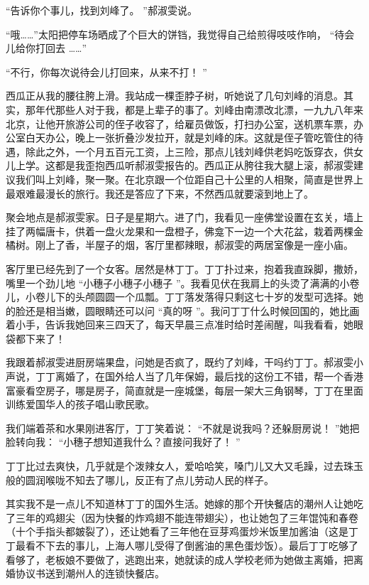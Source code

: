 \documentclass[12pt,twoside,openany]{book}
\begin{document}
“告诉你个事儿，找到刘峰了。 ”郝淑雯说。

“哦……”太阳把停车场晒成了个巨大的饼铛，我觉得自己给煎得吱吱作响， “待会儿给你打回去 ……”

“不行，你每次说待会儿打回来，从来不打！ ”

西瓜正从我的腰往胯上滑。我站成一棵歪脖子树，听她说了几句刘峰的消息。其实，那年代那些人对于我，都是上辈子的事了。刘峰由南漂改北漂，一九九八年来北京，让他开旅游公司的侄子收容了，给雇员做饭，打扫办公室，送机票车票，办公室白天办公，晚上一张折叠沙发拉开，就是刘峰的床。这就是侄子管吃管住的待遇，除此之外，一个月五百元工资，上三险，那点儿钱刘峰供老妈吃饭穿衣，供女儿上学。这都是我歪抱西瓜听郝淑雯报告的。西瓜正从胯往我大腿上滚，郝淑雯建议我们叫上刘峰，聚一聚。在北京跟一个位距自己十公里的人相聚，简直是世界上最艰难最漫长的旅行。我还是答应了下来，不然西瓜就要滚到地上了。

聚会地点是郝淑雯家。日子是星期六。进了门，我看见一座佛堂设置在玄关，墙上挂了两幅唐卡，供着一盘火龙果和一盘橙子，佛龛下一边一个大花盆，栽着两棵金橘树。刚上了香，半屋子的烟，客厅里都辣眼，郝淑雯的两居室像是一座小庙。

客厅里已经先到了一个女客。居然是林丁丁。丁丁扑过来，抱着我直跺脚，撒娇，嘴里一个劲儿地 “小穗子小穗子小穗子 ”。我看见伏在我肩上的头烫了满满的小卷儿，小卷儿下的头颅圆圆一个瓜瓢。丁丁落发落得只剩这七十岁的发型可选择。她的脸还是相当嫩，圆眼睛还可以问 “真的呀 ”。我问丁丁什么时候回国的，她比画着小手，告诉我她回来三四天了，每天早晨三点准时给时差闹醒，叫我看看，她眼袋都下来了！

我跟着郝淑雯进厨房端果盘，问她是否疯了，既约了刘峰，干吗约丁丁。郝淑雯小声说，丁丁离婚了，在国外给人当了几年保姆，最后找的这份工不错，帮一个香港富豪看空房子，哪是房子，简直就是一座城堡，每层一架大三角钢琴，丁丁在里面训练爱国华人的孩子唱山歌民歌。

我们端着茶和水果刚进客厅，丁丁笑着说： “不就是说我吗？还躲厨房说！ ”她把脸转向我： “小穗子想知道我什么？直接问我好了！ ”

丁丁比过去爽快，几乎就是个泼辣女人，爱哈哈笑，嗓门儿又大又毛躁，过去珠玉般的圆润喉咙不知去了哪儿，反正有了点儿劳动人民的样子。

其实我不是一点儿不知道林丁丁的国外生活。她嫁的那个开快餐店的潮州人让她吃了三年的鸡翅尖（因为快餐的炸鸡翅不能连带翅尖），也让她包了三年馄饨和春卷（十个手指头都皴裂了），还让她看了三年他在豆芽鸡蛋炒米饭里加酱油（这是丁丁最看不下去的事儿，上海人哪儿受得了倒酱油的黑色蛋炒饭）。最后丁丁吃够了看够了，老板娘不要做了，逃跑出来，她就读的成人学校老师为她做主离婚，把离婚协议书送到潮州人的连锁快餐店。
\end{document}
